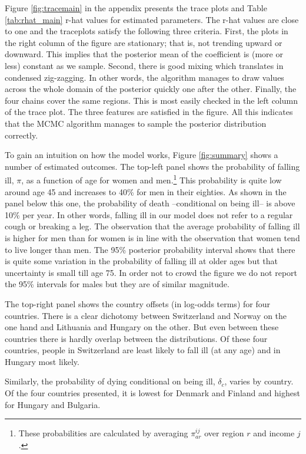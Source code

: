 \documentclass[a4paper,12pt]{article}
\begin{document}
Figure \ref{fig:tracemain} in the appendix presents the trace plots and Table \ref{tab:rhat_main} r-hat values for estimated parameters. The r-hat values are close to one and the traceplots satisfy the following three criteria. First, the plots in the right column of the figure are stationary; that is, not trending upward or downward. This implies that the posterior mean of the coefficient is (more or less) constant as we sample. Second, there is good mixing which translates in condensed zig-zagging. In other words, the algorithm manages to draw values across the whole domain of the posterior quickly one after the other. Finally, the four chains cover the same regions. This is most easily checked in the left column of the trace plot. The three features are satisfied in the figure. All this indicates that the MCMC algorithm manages to sample the posterior distribution correctly.

To gain an intuition on how the model works, Figure \ref{fig:summary} shows a number of estimated outcomes. The top-left panel shows the probability of falling ill, \(\pi\), as a function of age for women and men.\footnote{These probabilities are calculated by averaging \(\pi_{ar}^{ij}\) over region \(r\) and income \(j\).} This probability is quite low around age 45 and increases to 40\% for men in their eighties. As shown in the panel below this one, the probability of death --conditional on being ill-- is above 10\% per year. In other words, falling ill in our model  does not refer to a regular cough or breaking a leg. The observation that the average probability of falling ill is higher for men than for women is in line with the observation that women tend to live longer than men. The 95\% posterior probability interval shows that there is quite some variation in the probability of falling ill at older ages but that uncertainty is small till age 75. In order not to crowd the figure we do not report the 95\% intervals for males but they are of similar magnitude.

The top-right panel shows the country offsets (in log-odds terms) for four countries. There is a clear dichotomy between Switzerland and Norway on the one hand and Lithuania and Hungary on the other. But even between these countries there is hardly overlap between the distributions. Of these four countries, people in Switzerland are least likely to fall ill (at any age) and in Hungary most likely.

Similarly, the probability of dying conditional on being ill, \(\delta_{c}\), varies by country. Of the four countries presented, it is lowest for Denmark and Finland and highest for Hungary and Bulgaria.
\end{document}
